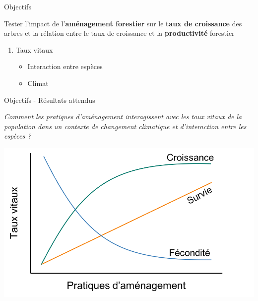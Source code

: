 \documentclass[11pt, compress, aspectratio=1610]{beamer}
\providecommand{\tightlist}{%
  \setlength{\itemsep}{0pt}\setlength{\parskip}{0pt}}
\begin{document}
\begin{frame}{Objectifs}
\protect\hypertarget{objectifs-3}{}

\centering

Tester l’impact de l’\textbf{aménagement forestier} sur le \textbf{taux
de croissance} des arbres et la rélation entre le taux de croissance et
la \textbf{productivité} forestier

\begin{enumerate}
[1.]
\tightlist
\item
  Taux vitaux

  \begin{itemize}
  \tightlist
  \item
    Interaction entre espèces
  \item
    Climat
  \end{itemize}
\end{enumerate}

\end{frame}

\begin{frame}{Objectifs - Résultats attendus}
\protect\hypertarget{objectifs---ruxe9sultats-attendus-2}{}

\centering

\emph{Comment les pratiques d’aménagement interagissent avec les taux
vitaux de la population dans un contexte de changement climatique et
d’interaction entre les espèces ?}

\vspace*{10mm}
\centering

\includegraphics[scale=0.45]{figures/output_chap3a.png}

\par

\end{frame}
\end{document}
